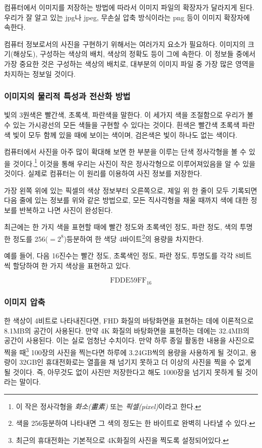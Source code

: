 \documentclass{article}
\begin{document}
컴퓨터에서 이미지를 저장하는 방법에 따라서 이미지 파일의 확장자가 달라지게 된다.
우리가 잘 알고 있는 jpg나 jpeg, 무손실 압축 방식이라는 png 등이 이미지 확장자에 속한다.

컴퓨터 정보로서의 사진을 구현하기 위해서는 여러가지 요소가 필요하다.
이미지의 크기(해상도), 구성하는 색상의 배치, 색상의 정확도 등이 그에 속한다.
이 정보들 중에서 가장 중요한 것은 구성하는 색상의 배치로,
대부분의 이미지 파일 중 가장 많은 영역을 차지하는 정보일 것이다.

\subsubsection{이미지의 물리적 특성과 전산화 방법}

빛의 3원색은 빨간색, 초록색, 파란색을 말한다. 이 세가지 색을 조절함으로 우리가 볼 수 있는
가시광선의 모든 색들을 구현할 수 있다는 것이다. 흰색은 빨간색 초록색 파란색 빛이 모두 함께 있을 때에
보이는 색이며, 검은색은 빛이 하나도 없는 색이다.

컴퓨터에서 사진을 아주 많이 확대해 보면 한 부분을 이루는 단색 정사각형을 볼 수 있을
것이다.\footnote{이 작은 정사각형을 \textit{화소(畫素)} 또는 \textit{픽셀(pixel)}이라고 한다.}
이것을 통해 우리는 사진이 작은 정사각형으로 이루어져있음을 알 수 있을 것이다.
실제로 컴퓨터는 이 원리를 이용하여 사진 정보를 저장한다.

가장 왼쪽 위에 있는 픽셀의 색상 정보부터 오른쪽으로,
제일 위 한 줄이 모두 기록되면 다음 줄에 있는 정보를 위와 같은 방법으로,
모든 직사각형을 채울 때까지 색에 대한 정보를 반복하고 나면 사진이 완성된다.

최근에는 한 가지 색을 표현할 때에 빨간 정도와 초록색인 정도, 파란 정도, 색의 투명한 정도를
256($=2^8$)등분하여 한 색당 4바이트\footnote{색을 256등분하여 나타내면 그 색의 정도는 한
바이트로 완벽히 나타낼 수 있다.}의 용량을 차지한다.

예를 들어, 다음 16진수는 빨간 정도, 초록색인 정도, 파란 정도, 투명도를 각각 8비트씩 할당하여
한 가지 색상을 표현하고 있다.

$$
\text{FDDE59FF}_{16}
$$

\subsubsection{이미지 압축}

한 색상이 4비트로 나타내진다면, FHD 화질의 바탕화면을 표현하는 데에 이론적으로 8.1MB의 공간이
사용된다. 만약 4K 화질의 바탕화면을 표현하는 데에는 32.4MB의 공간이 사용된다.
이는 실로 엄청난 수치이다. 만약 하루 종일 활동한 내용을 사진으로 찍을 때\footnote{최근의
휴대전화는 기본적으로 4K화질의 사진을 찍도록 설정되어있다.} 100장의 사진을 찍는다면
하루에 3.24GB씩의 용량을 사용하게 될 것이고, 용량이 32GB인 휴대전화로는 열흘을 채 넘기지 못하고
더 이상의 사진을 찍을 수 없게 될 것이다. 즉, 아무것도 없이 사진만 저장한다고 해도 1000장을
넘기지 못하게 될 것이라는 말이다.
\end{document}
